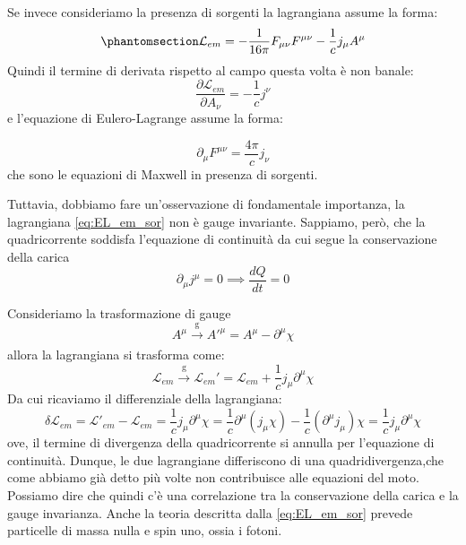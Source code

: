 Se invece consideriamo la presenza di sorgenti la lagrangiana assume la forma:
\begin{equation}\phantomsection\label{eq:EL_em_sor}
    \mathcal{L}_{em}=-\dfrac{1}{16\pi} F_{\mu\nu}F^{\mu\nu}-\dfrac{1}{c}j_\mu A^\mu
\end{equation}
Quindi il termine di derivata rispetto al campo questa volta è non banale:
\begin{equation}
 \dfrac{\partial\mathcal{L}_{em}}{\partial A_\nu}=-\dfrac{1}{c}j^\nu
\end{equation}
e l'equazione di Eulero-Lagrange assume la forma:

\begin{equation}
\partial_\mu   F^{\mu\nu}=\dfrac{4\pi}{c}j_\nu
\end{equation}
che sono le equazioni di Maxwell in presenza di sorgenti.

Tuttavia, dobbiamo fare un'osservazione di fondamentale importanza, la lagrangiana \eqref{eq:EL_em_sor} non è gauge invariante. Sappiamo, però, che la quadricorrente soddisfa l'equazione di continuità da cui segue la conservazione della carica
\begin{equation}
\partial_\mu   j^{\mu}=0\implies\dfrac{dQ}{dt}=0
\end{equation}

Consideriamo la trasformazione di gauge
\begin{equation}
   A^\mu
   \xrightarrow[\text{}]{\text{g}}
  A'^\mu
    =A^\mu-\partial^\mu \chi
\end{equation}
allora la lagrangiana si trasforma come:
\begin{equation}
  \mathcal{L}_{em}
   \xrightarrow[\text{}]{\text{g}}
   \mathcal{L}_{em}'
    =  \mathcal{L}_{em}+\dfrac{1}{c}j_\mu\partial^\mu\chi
\end{equation}
Da cui ricaviamo il differenziale della lagrangiana:
\begin{equation}
  \delta\mathcal{L}_{em}=\mathcal{L}'_{em}-\mathcal{L}_{em}=\dfrac{1}{c}j_\mu\partial^\mu\chi= \dfrac{1}{c}\partial^\mu(j_\mu\chi)-\dfrac{1}{c}(\partial^\mu j_\mu)\chi=\dfrac{1}{c}j_\mu\partial^\mu\chi
\end{equation}
ove, il termine di divergenza della quadricorrente si annulla per l'equazione di continuità. Dunque, le due lagrangiane differiscono di una quadridivergenza,che come abbiamo già detto più volte non contribuisce alle equazioni del moto. Possiamo dire che quindi c'è una correlazione tra la conservazione della carica e la gauge invarianza. Anche la teoria descritta dalla \eqref{eq:EL_em_sor} prevede particelle di massa nulla e spin uno, ossia i fotoni.

